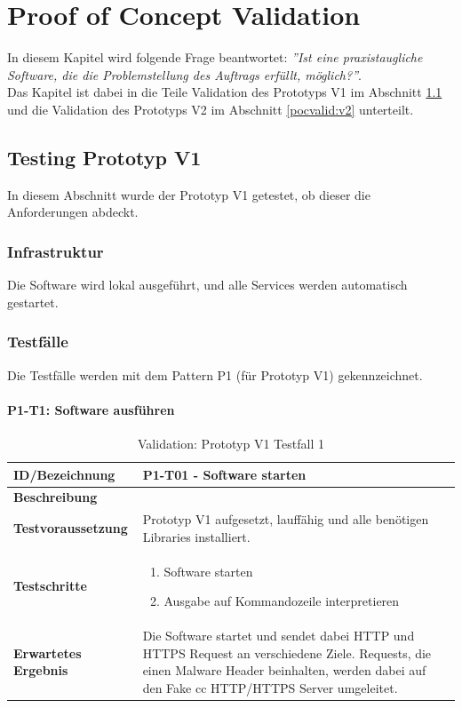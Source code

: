 \chapter{Proof of Concept Validation}
\label{pocvalid:chapter}
In diesem Kapitel wird folgende Frage beantwortet: \textit{''Ist eine praxistaugliche Software, die die Problemstellung des Auftrags erfüllt, möglich?''}.\\

Das Kapitel ist dabei in die Teile Validation des Prototyps V1 im Abschnitt \ref{pocvalid:v1} und die Validation des Prototyps V2 im Abschnitt \ref{pocvalid:v2} unterteilt.

\section{Testing Prototyp V1}
\label{pocvalid:v1}
In diesem Abschnitt wurde der Prototyp V1 getestet, ob dieser die Anforderungen abdeckt.
\subsection{Infrastruktur}
Die Software wird lokal ausgeführt, und alle Services werden automatisch gestartet.

\subsection{Testfälle}
Die Testfälle werden mit dem Pattern P1 (für Prototyp V1) gekennzeichnet.


\begin{table}[H]
	\subsubsection{P1-T1: Software ausführen}
    \centering
	\begin{tabularx}{\textwidth}{| l | p{} |}
        \hline
        \textbf{ID/Bezeichnung} & P1-T01 - Software starten\\ \hline
        \textbf{Beschreibung} &  \\ \hline  
        \textbf{Testvoraussetzung} & Prototyp V1 aufgesetzt, lauffähig und alle benötigen Libraries installiert. \\ \hline      
        \textbf{Testschritte} & \begin{enumerate}
        	\item Software starten
        	\item Ausgabe auf Kommandozeile interpretieren
        \end{enumerate} \\ \hline    
        \textbf{Erwartetes Ergebnis} & Die Software startet und sendet dabei HTTP und HTTPS Request an verschiedene Ziele. Requests, die einen Malware Header beinhalten, werden dabei auf den Fake \gls{cc} HTTP/HTTPS Server umgeleitet. \\ \hline      
    \end{tabularx}
    \caption{Validation: Prototyp V1 Testfall 1}
\end{table}




